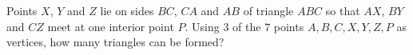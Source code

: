 Points $X$, $Y$ and $Z$ lie on sides $BC$, $CA$ and $AB$ of triangle $ABC$ so that $AX$, $BY$ and $CZ$ meet at one interior point $P$. Using $3$ of the $7$ points $A,B,C,X,Y,Z,P$ as vertices, how many triangles can be formed?
